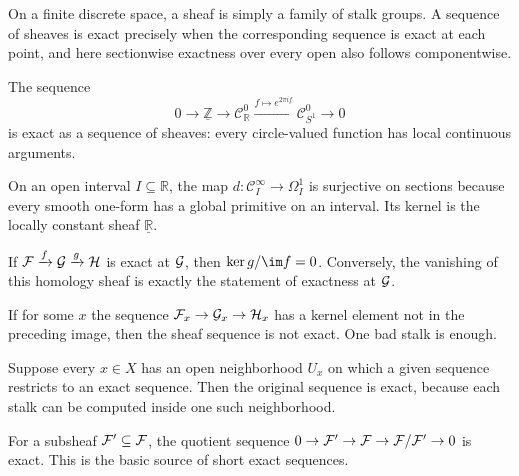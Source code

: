 \begin{example}
On a finite discrete space, a sheaf is simply a family of stalk groups.  A sequence of sheaves is exact precisely when the corresponding sequence is exact at each point, and here sectionwise exactness over every open also follows componentwise.
\end{example}

\begin{example}
The sequence
\[
0\to\underline{\mathbb Z}\to\mathcal C^0_{\mathbb R}
\xrightarrow{f\mapsto e^{2\pi i f}}\mathcal C^0_{S^1}\to0
\]
is exact as a sequence of sheaves: every circle-valued function has local continuous arguments.
\end{example}

\begin{example}
On an open interval $I\subseteq\mathbb R$, the map
$d:\mathcal C^\infty_I\to\Omega^1_I$ is surjective on sections because every smooth one-form has a global primitive on an interval.  Its kernel is the locally constant sheaf $\underline{\mathbb R}$.
\end{example}

\begin{example}
If $\mathcal F\xrightarrow{f}\mathcal G\xrightarrow{g}\mathcal H$ is exact at $\mathcal G$, then
$\ker g/\im f=0$.  Conversely, the vanishing of this homology sheaf is exactly the statement of exactness at $\mathcal G$.
\end{example}

\begin{example}
If for some $x$ the sequence $\mathcal F_x\to\mathcal G_x\to\mathcal H_x$ has a kernel element not in the preceding image, then the sheaf sequence is not exact.  One bad stalk is enough.
\end{example}

\begin{example}
Suppose every $x\in X$ has an open neighborhood $U_x$ on which a given sequence restricts to an exact sequence.  Then the original sequence is exact, because each stalk can be computed inside one such neighborhood.
\end{example}

\begin{example}
For a subsheaf $\mathcal F'\subseteq\mathcal F$, the quotient sequence
$0\to\mathcal F'\to\mathcal F\to\mathcal F/\mathcal F'\to0$ is exact.  This is the basic source of short exact sequences.
\end{example}

